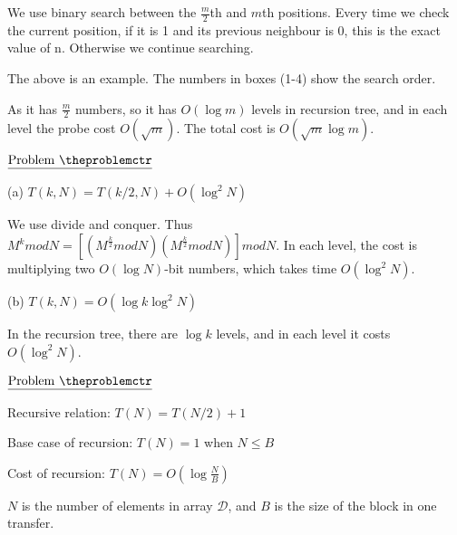 \documentclass[11pt]{article}
\def\pp{\par\noindent}
\begin{document}
We use binary search between the $\frac{m}{2}$th and $m$th positions. Every time we check the current position, if it is 1 and its previous neighbour is 0, this is the exact value of n. Otherwise we continue searching.

The above is an example. The numbers in boxes (1-4) show the search order.

As it has $\frac{m}{2}$ numbers, so it has $O(\log m)$ levels in recursion tree, and in each level the probe cost $O(\sqrt{m})$. The total cost is $O(\sqrt{m}\log m)$.

\vfill
\newpage
\addtocounter{problemctr}{1}
\bigskip
\noindent
$\underline{\rm Problem\ \theproblemctr}$\pp
\noindent
(a) $T(k, N) = T(k/2, N)+O(\log^2 N)$

We use divide and conquer. Thus $M^k mod N = [(M^{\frac{k}{2}} mod N)(M^{\frac{k}{2}} mod N)] mod N$. In each level, the cost is multiplying two $O(\log N)$-bit numbers, which takes time $O(\log^2 N)$.

\bigskip
\bigskip
\noindent
(b) $T(k, N) = O(\log k \log^2 N)$

In the recursion tree, there are $\log k$ levels, and in each level it costs $O(\log^2 N)$.

\vfill
\newpage
\addtocounter{problemctr}{1}
\bigskip
\noindent
$\underline{\rm Problem\ \theproblemctr}$\pp
\noindent
Recursive relation: $T(N) = T(N/2) +1$

\noindent
Base case of recursion: $T(N) = 1$ when $N \le B$

\noindent
Cost of recursion: $T(N) = O(\log \frac{N}{B})$

\bigskip
\noindent
$N$ is the number of elements in array $\mathcal{D}$, and $B$ is the size of the block in one transfer.
\end{document}
